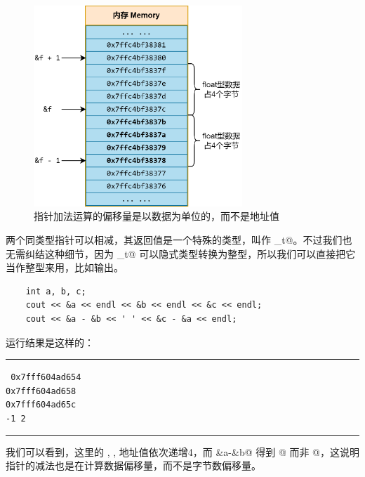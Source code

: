 \begin{figure}[htbp]
    \centering
    \includegraphics[width=0.7\textwidth]{../images/generalized_parts/05_arithmetic_of_pointer.drawio.png}
    \caption{指针加法运算的偏移量是以数据为单位的，而不是地址值}
\end{figure}
两个同类型指针可以相减，其返回值是一个特殊的类型，叫作 \lstinline@ptrdiff_t@。不过我们也无需纠结这种细节，因为 \lstinline@ptrdiff_t@ 可以隐式类型转换为整型，所以我们可以直接把它当作整型来用，比如输出。
\begin{lstlisting}
    int a, b, c;
    cout << &a << endl << &b << endl << &c << endl;
    cout << &a - &b << ' ' << &c - &a << endl;
\end{lstlisting}
运行结果是这样的：\\\noindent\rule{\linewidth}{0.2pt}\texttt{
0x7fff604ad654\\
0x7fff604ad658\\
0x7fff604ad65c\\
-1 2
}\\\noindent\rule{\linewidth}{0.2pt}
我们可以看到，这里的 \lstinline@a@, \lstinline@b@, \lstinline@c@ 地址值依次递增4，而 \lstinline@&a-&b@ 得到 @ 而非 @，这说明指针的减法也是在计算数据偏移量，而不是字节数偏移量。\par
